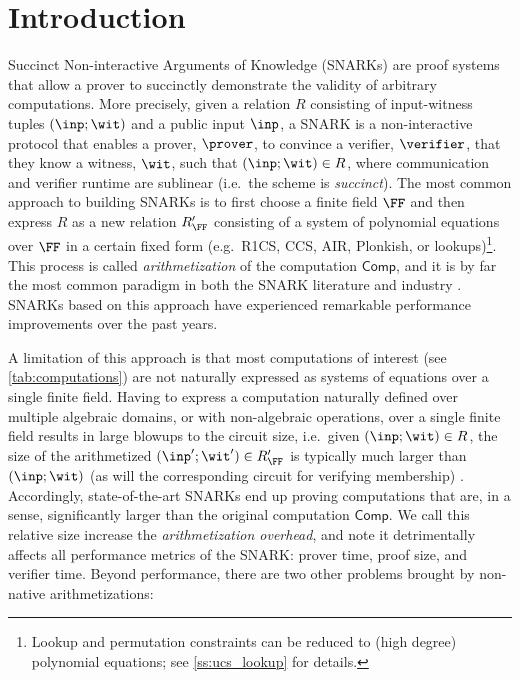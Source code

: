 \section{Introduction}
\label{sec:introduction}


\newcommand{\comp}{\mathsf{Comp}}

Succinct Non-interactive Arguments of Knowledge (SNARKs) are proof systems that allow a prover to succinctly demonstrate the validity of arbitrary computations. More precisely, given a relation $R$ consisting of input-witness tuples $(\inp;\wit)$ and a public input $\inp$, a SNARK is a non-interactive protocol that enables a prover, $\prover$, to convince a verifier, $\verifier$, that they know a witness, $\wit$, such that $(\inp;\wit)\in R$, 
where communication and verifier runtime are sublinear (i.e.\ the scheme is \emph{succinct}). The most common approach to building SNARKs is to first choose a finite field $\FF$ and then express $R$ as a new relation $R_{\FF}'$ consisting 
of a system of polynomial equations over $\FF$ in a certain fixed form (e.g.\ R1CS, CCS, AIR, Plonkish, or lookups)\footnote{Lookup and permutation constraints can be reduced to (high degree) polynomial equations; see \cref{ss:ucs_lookup} for details.}. This process is called \emph{arithmetization} of the computation $\comp$, and it is by far the most common paradigm in both the SNARK literature and industry \cite{EC:Groth16,GWC19,ethstark,Cairo}. SNARKs based on this approach have experienced remarkable performance improvements over the past years. 


A limitation of this approach is that most computations of interest (see \cref{tab:computations}) are not naturally expressed as systems of equations over a single finite field. Having to express a computation naturally defined over multiple algebraic domains, or with non-algebraic operations, over a single finite field results in large blowups to the circuit size, i.e.\ given $(\inp;\wit)\in R$, the size of the arithmetized $(\inp';\wit') \in R_{\FF}'$ is typically much larger than $(\inp;\wit)$ (as will the corresponding circuit for verifying membership) \cite{Zinc,jea_codes,EFpaper,EC:DiaPos25}.  Accordingly, state-of-the-art SNARKs end up proving computations that are, in a sense, significantly larger than the original computation $\comp$. We call this relative size increase the \emph{arithmetization overhead}, and note it detrimentally affects all performance metrics of the SNARK: prover time, proof size, and verifier time. Beyond performance, there are two other problems brought by non-native arithmetizations:

